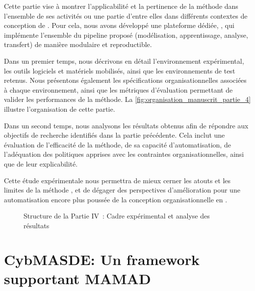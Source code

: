 \noindent
Cette partie vise à montrer l'applicabilité et la pertinence de la méthode  dans l'ensemble de ses activités ou une partie d'entre elles dans différents contextes de conception de . Pour cela, nous avons développé une plateforme dédiée, , qui implémente l'ensemble du pipeline proposé (modélisation, apprentissage, analyse, transfert) de manière modulaire et reproductible.

\medskip

\noindent
Dans un premier temps, nous décrivons en détail l'environnement expérimental, les outils logiciels et matériels mobilisés, ainsi que les environnements de test retenus. Nous présentons également les spécifications organisationnelles associées à chaque environnement, ainsi que les métriques d'évaluation permettant de valider les performances de la méthode. La \autoref{fig:organisation_manuscrit_partie_4} illustre l'organisation de cette partie.

\medskip

\noindent
Dans un second temps, nous analysons les résultats obtenus afin de répondre aux objectifs de recherche identifiés dans la partie précédente. Cela inclut une évaluation de l'efficacité de la méthode, de sa capacité d'automatisation, de l'adéquation des politiques apprises avec les contraintes organisationnelles, ainsi que de leur explicabilité.

\medskip

\noindent
Cette étude expérimentale nous permettra de mieux cerner les atouts et les limites de la méthode , et de dégager des perspectives d'amélioration pour une automatisation encore plus poussée de la conception organisationnelle en .

\begin{figure}[h!]
  \centering
  \resizebox{0.7\linewidth}{!}{%
    
  }
  \caption{Structure de la Partie IV~: Cadre expérimental et analyse des résultats}
  \label{fig:organisation_manuscrit_partie_4}
\end{figure}

\clearpage
\thispagestyle{empty}
\null
\newpage

\chapter{CybMASDE: Un framework supportant MAMAD}
\label{sec:cybmasde}



